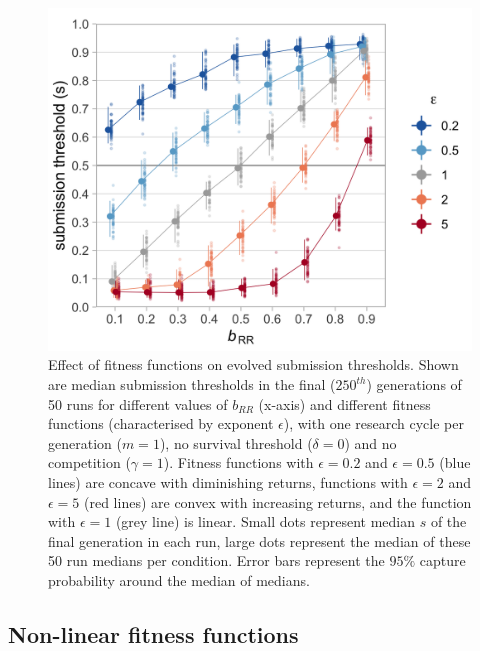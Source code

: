 \documentclass[
  ,man,mask,floatsintext]{apa6}
\begin{document}
\begin{figure}

{\centering \includegraphics[width=0.65\linewidth]{plots/plot_b_epsilon} 

}

\caption{Effect of fitness functions on evolved submission thresholds. Shown are median submission thresholds in the final (\(250^{th}\)) generations of 50 runs for different values of \(b_{RR}\) (x-axis) and different fitness functions (characterised by exponent \(\epsilon\)), with one research cycle per generation (\(m = 1\)), no survival threshold (\(\delta = 0\)) and no competition (\(\gamma = 1\)). Fitness functions with \(\epsilon = 0.2\) and \(\epsilon = 0.5\) (blue lines) are concave with diminishing returns, functions with \(\epsilon = 2\) and \(\epsilon = 5\) (red lines) are convex with increasing returns, and the function with \(\epsilon = 1\) (grey line) is linear. Small dots represent median \(s\) of the final generation in each run, large dots represent the median of these 50 run medians per condition. Error bars represent the \(95\%\) capture probability around the median of medians.}\label{fig:epsilonplot}
\end{figure}

\hypertarget{non-linear-fitness-functions-1}{%
\subsection{Non-linear fitness functions}\label{non-linear-fitness-functions-1}}
\end{document}
